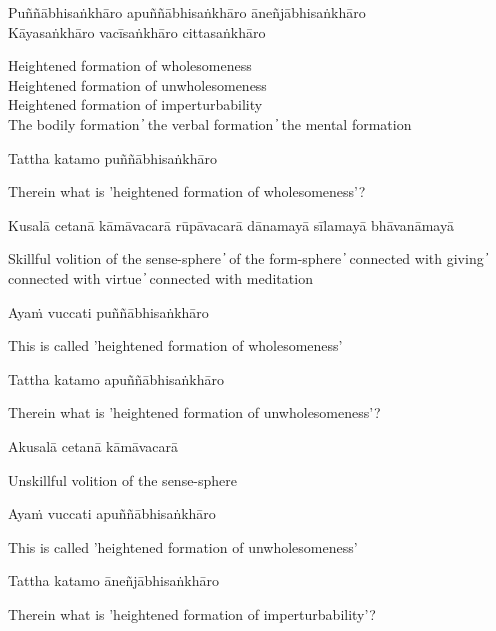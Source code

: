 Puññābhisaṅkhāro apuññābhisaṅkhāro āneñjābhisaṅkhāro\\
Kāyasaṅkhāro vacīsaṅkhāro cittasaṅkhāro

\begin{cprenglish}
  Heightened formation of wholesomeness\\
  Heightened formation of unwholesomeness\\
  Heightened formation of imperturbability\\
  The bodily formation  ̓  the verbal formation  ̓  the mental formation
\end{cprenglish}

Tattha katamo puññābhisaṅkhāro

\begin{cprenglish}
  Therein what is 'heightened formation of wholesomeness'?
\end{cprenglish}

Kusalā cetanā kāmāvacarā rūpāvacarā dānamayā sīlamayā bhāvanāmayā

\begin{cprenglish}
  Skillful volition of the sense-sphere  ̓  of the form-sphere  ̓  connected with giving  ̓  connected with virtue  ̓  connected with meditation
\end{cprenglish}

Ayaṁ vuccati puññābhisaṅkhāro

\begin{cprenglish}
  This is called 'heightened formation of wholesomeness'
\end{cprenglish}

Tattha katamo apuññābhisaṅkhāro

\begin{cprenglish}
  Therein what is 'heightened formation of unwholesomeness'?
\end{cprenglish}

Akusalā cetanā kāmāvacarā

\begin{cprenglish}
  Unskillful volition of the sense-sphere
\end{cprenglish}

Ayaṁ vuccati apuññābhisaṅkhāro

\begin{cprenglish}
  This is called 'heightened formation of unwholesomeness'
\end{cprenglish}

Tattha katamo āneñjābhisaṅkhāro

\begin{cprenglish}
  Therein what is 'heightened formation of imperturbability'?
\end{cprenglish}

